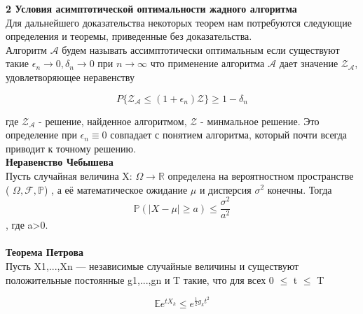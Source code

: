 \documentclass[a4paper, 14pt]{extarticle}
\begin{document}
\newcommand{\algorithm}{$\mathcal{A'}$}
\newcommand{\topboundE}{$\mathcal{Z^*_{A'}}$}
\newcommand{\topboundD}{$\mathcal{D^*_{A'}}$}
\newcommand{\randomvalue}{$\mathcal{Z_{A'}}$}
\newcommand{\randomvalueE}{$E(\text{\randomvalue})$}
\newcommand{\randomvalueD}{$D(\text{\randomvalue})$}

\textbf{2 Условия асимптотической оптимальности жадного алгоритма}\\

Для дальнейшего доказательства некоторых теорем нам потребуются следующие определения и теоремы, приведенные без доказательства.\\


Алгоритм $\mathcal{A}$ будем называть ассимптотически оптимальным если существуют такие $\epsilon_n \rightarrow 0, \delta_n \rightarrow 0$ при $n \rightarrow \infty$ что применение алгоритма $\mathcal{A}$ дает значение  $\mathcal{Z_A}$, удовлетворяющее неравенству
 
\begin{equation}\label{1}
P\{\mathcal{Z_A} \leq (1+\epsilon_n)\mathcal{Z}\}\geq 1-\delta_n
\end{equation}

где $\mathcal{Z_A}$ - решение, найденное алгоритмом, $\mathcal{Z}$ - минмальное решение.
Это определение при $\epsilon_n \equiv 0$ совпадает с понятием алгоритма, который почти всегда приводит к точному решению. \\


\textbf{Неравенство Чебышева} \\

Пусть случайная величина X: $\Omega\rightarrow\mathbb {R}$ определена на вероятностном пространстве ( $\Omega,{\mathcal {F}},\mathbb {P} $)
, а её математическое ожидание $\mu$ и дисперсия  $\sigma ^{2}$ конечны. Тогда 
\begin{equation}
{\mathbb {P}}\left(|X-\mu |\geqslant a\right)\leqslant {\frac {\sigma ^{2}}{a^{2}}}
\end{equation},
где  a>0. \\ \\


\textbf{Теорема Петрова} \\

Пусть X1,...,Xn — независимые случайные величины и
существуют положительные постоянные g1,...,gn и T такие, что для всех 0 $\leq$ t $\leq$ T

\begin{equation}
\mathbb {E}e^{tX_k} \leq e^{\frac{1}{2} g_k t^{2}}
\end{equation}
\end{document}
